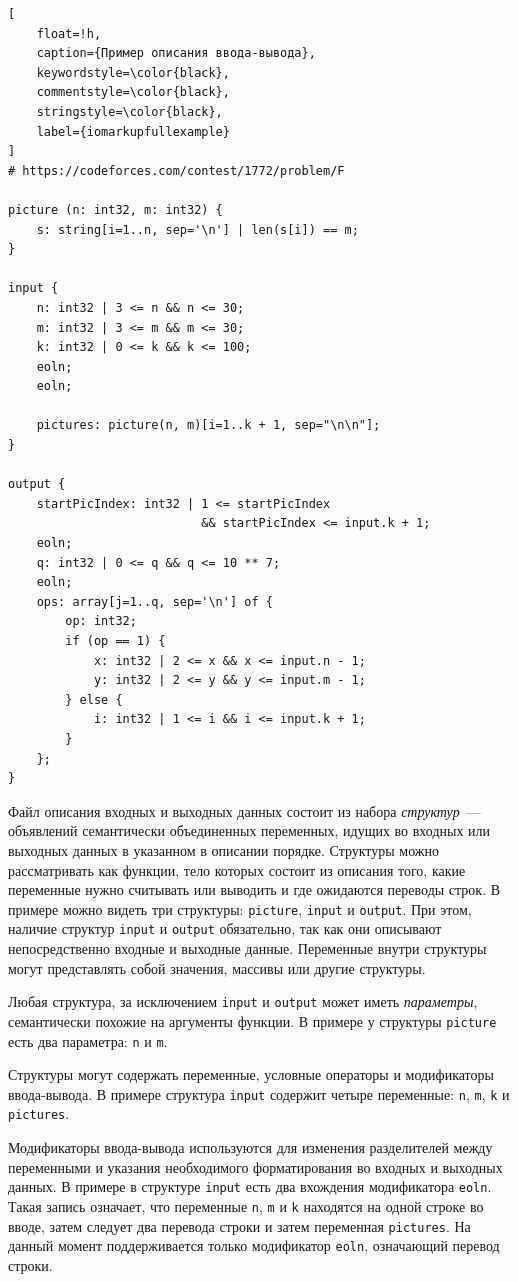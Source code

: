 \documentclass[times,specification,annotation]{style/itmo-student-thesis/itmo-student-thesis}
\begin{document}
\begin{lstlisting}[
    float=!h,
    caption={Пример описания ввода-вывода},
    keywordstyle=\color{black},
    commentstyle=\color{black},
    stringstyle=\color{black},
    label={iomarkupfullexample}
]
# https://codeforces.com/contest/1772/problem/F

picture (n: int32, m: int32) {
    s: string[i=1..n, sep='\n'] | len(s[i]) == m;
}

input {
    n: int32 | 3 <= n && n <= 30;
    m: int32 | 3 <= m && m <= 30;
    k: int32 | 0 <= k && k <= 100;
    eoln;
    eoln;

    pictures: picture(n, m)[i=1..k + 1, sep="\n\n"];
}

output {
    startPicIndex: int32 | 1 <= startPicIndex
                           && startPicIndex <= input.k + 1;
    eoln;
    q: int32 | 0 <= q && q <= 10 ** 7;
    eoln;
    ops: array[j=1..q, sep='\n'] of {
        op: int32;
        if (op == 1) {
            x: int32 | 2 <= x && x <= input.n - 1;
            y: int32 | 2 <= y && y <= input.m - 1;
        } else {
            i: int32 | 1 <= i && i <= input.k + 1;
        }
    };
}

\end{lstlisting}

Файл описания входных и выходных данных состоит из набора \textit{структур}~--- объявлений семантически объединенных переменных, идущих во входных или выходных данных в указанном в описании порядке. Структуры можно рассматривать как функции, тело которых состоит из описания того, какие переменные нужно считывать или выводить и где ожидаются переводы строк. В примере можно видеть три структуры: \texttt{picture}, \texttt{input} и \texttt{output}. При этом, наличие структур \texttt{input} и \texttt{output} обязательно, так как они описывают непосредственно входные и выходные данные. Переменные внутри структуры могут представлять собой значения, массивы или другие структуры.

Любая структура, за исключением \texttt{input} и \texttt{output} может иметь \textit{параметры}, семантически похожие на аргументы функции. В примере у структуры \texttt{picture} есть два параметра: \texttt{n} и \texttt{m}.

Структуры могут содержать переменные, условные операторы и модификаторы ввода-вывода. В примере структура \texttt{input} содержит четыре переменные: \texttt{n}, \texttt{m}, \texttt{k} и \texttt{pictures}.

Модификаторы ввода-вывода используются для изменения разделителей между переменными и указания необходимого форматирования во входных и выходных данных. В примере в структуре \texttt{input} есть два вхождения модификатора \texttt{eoln}. Такая запись означает, что переменные \texttt{n}, \texttt{m} и \texttt{k} находятся на одной строке во вводе, затем следует два перевода строки и затем переменная \texttt{pictures}. На данный момент поддерживается только модификатор \texttt{eoln}, означающий перевод строки.
\end{document}
